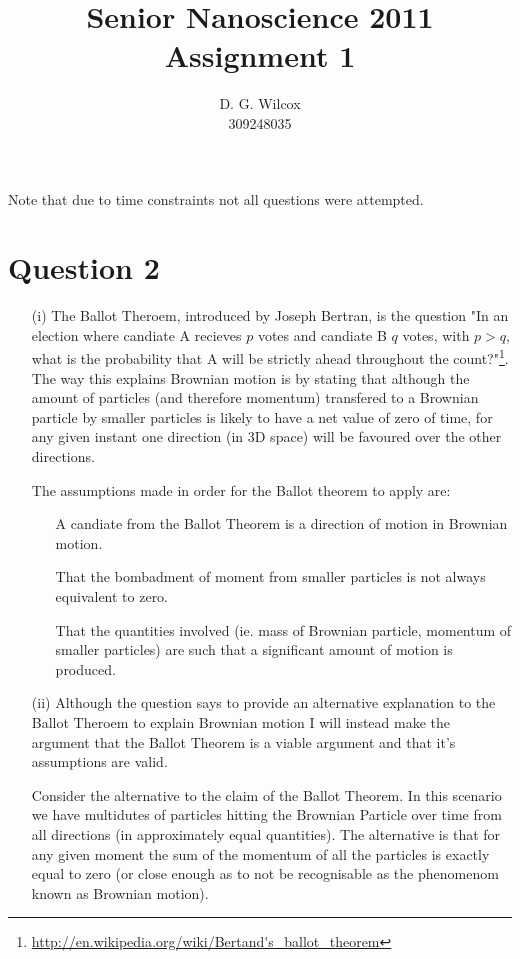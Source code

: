 \documentclass[10pt,a4paper]{article}
\title{Senior Nanoscience 2011 Assignment 1}
\date{}
\author{D. G. Wilcox \\
		309248035}
\begin{document}
\maketitle

Note that due to time constraints not all questions were attempted.

\section*{Question 2}

\begin{itemize}
	\item[(i)] The Ballot Theroem, introduced by Joseph Bertran, is the question "In an election where candiate A recieves $p$ votes and candiate B $q$ votes, with $p > q$, what is the probability that A will be strictly ahead throughout the count?"\footnote{\url{http://en.wikipedia.org/wiki/Bertand's_ballot_theorem}}. The way this explains Brownian motion is by stating that although the amount of particles (and therefore momentum) transfered to a Brownian particle by smaller particles is likely to have a net value of zero of time, for any given instant one direction (in 3D space) will be favoured over the other directions.

	The assumptions made in order for the Ballot theorem to apply are:
		\begin{itemize}
			\item[\textbullet] A candiate from the Ballot Theorem is a direction of motion in Brownian motion.
			\item[\textbullet] That the bombadment of moment from smaller particles is not always equivalent to zero.
			\item[\textbullet] That the quantities involved (ie. mass of Brownian particle, momentum of smaller particles) are such that a significant amount of motion is produced.
		\end{itemize}
	\item[(ii)] Although the question says to provide an alternative explanation to the Ballot Theroem to explain Brownian motion I will instead make the argument that the Ballot Theorem is a viable argument and that it's assumptions are valid.

	Consider the alternative to the claim of the Ballot Theorem. In this scenario we have multidutes of particles hitting the Brownian Particle over time from all directions (in approximately equal quantities). The alternative is that for any given moment the sum of the momentum of all the particles is exactly equal to zero (or close enough as to not be recognisable as the phenomenom known as Brownian motion).


\end{itemize}
\end{document}
